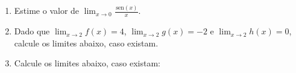 \documentclass[a4paper,5pt]{amsbook}
\newcommand{\sen}{\,\mbox{sen}}
\newcommand{\ds}{\displaystyle}
\newcommand{\ra}{\rightarrow}
\begin{document}
\begin{enumerate}
    \vspace{0.5cm}
    \item Estime o valor de $\ds\lim_{x\rightarrow 0} \frac{\sen(x)}{x}$.

    \vspace{0.5cm}
    \item Dado que $\ds\lim_{x \ra 2} f(x)=4$, $\ds\lim_{x \ra 2} g(x)=-2$ e
        $\ds\lim_{x \ra 2} h(x)=0$, calcule os limites abaixo, caso existam.

        \noindent{}

    \vspace{0.5cm}
    \item Calcule os limites abaixo, caso existam:


\end{enumerate}
\end{document}
